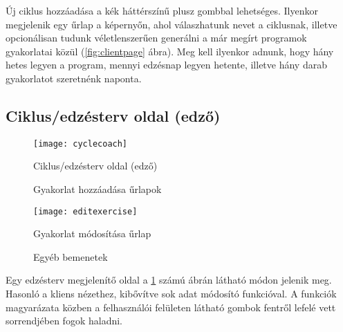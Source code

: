 Új ciklus hozzáadása a kék háttérszínű plusz gombbal lehetséges. Ilyenkor megjelenik egy űrlap a képernyőn, ahol válaszhatunk nevet a ciklusnak, illetve opcionálisan tudunk véletlenszerűen generálni a már megírt programok gyakorlatai közül (\ref{fig:clientpage} ábra). Meg kell ilyenkor adnunk, hogy hány hetes legyen a program, mennyi edzésnap legyen hetente, illetve hány darab gyakorlatot szeretnénk naponta.

\subsection{Ciklus/edzésterv oldal (edző)}

\begin{figure}[H]
	\centering
	\texttt{[image: cyclecoach]}
	\caption{Ciklus/edzésterv oldal (edző)}
	\label{fig:cyclecoach}
\end{figure}

\begin{figure}[H]
	\centering
	\hspace{5pt}
	\caption{Gyakorlat hozzáadása űrlapok}
	\label{fig:addexercise}
\end{figure}

\begin{figure}[H]
	\centering
	\texttt{[image: editexercise]}
	\caption{Gyakorlat módosítása űrlap}
	\label{fig:editexercise}
\end{figure}

\begin{figure}[H]
	\centering
	\hspace{5pt}
	\caption{Egyéb bemenetek}
	\label{fig:rpeselector}
\end{figure}



Egy edzésterv megjelenítő oldal a \ref{fig:cyclecoach} számú ábrán látható módon jelenik meg. Hasonló a kliens nézethez, kibővítve sok adat módosító funkcióval. A funkciók magyarázata közben a felhasználói felületen látható gombok fentről lefelé vett sorrendjében fogok haladni.

